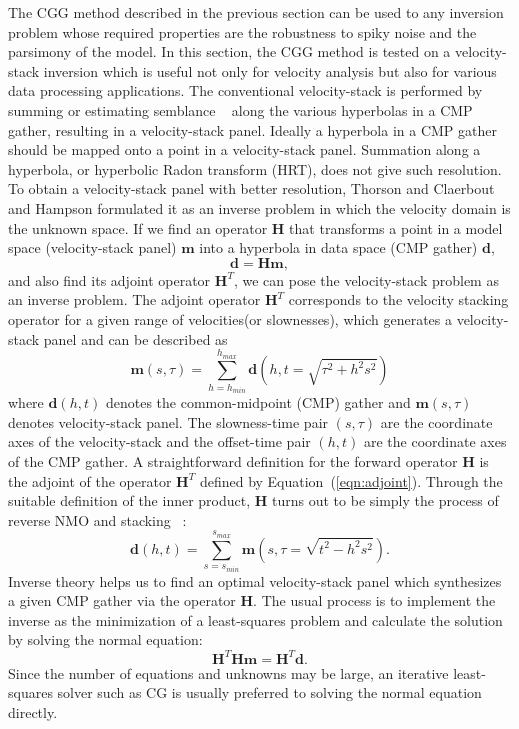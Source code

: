 The CGG method described in the previous section can be used to any inversion problem 
whose required properties are the robustness to spiky noise and the parsimony of the model.
In this section, the CGG method is tested on a velocity-stack inversion
which is useful not only for velocity analysis 
but also for various data processing applications.
The conventional velocity-stack
is performed by summing or estimating semblance ~\cite{GEO34-06-08590881}
along the various hyperbolas in a CMP gather, 
resulting in a velocity-stack panel.
Ideally a hyperbola in a CMP gather should be mapped 
onto a point in a velocity-stack panel. 
Summation along a hyperbola, or hyperbolic Radon transform (HRT), 
does not give such resolution.
To obtain a velocity-stack panel with better resolution,
Thorson and Claerbout  and Hampson 
formulated it as an inverse problem in which the velocity
domain is the unknown space.  
If we find an operator $\mathbf H$ that transforms 
a point in a model space (velocity-stack panel) $\mathbf m$ 
into a hyperbola in data space (CMP gather) $\mathbf d$, 
\begin{equation}
\mathbf d = \mathbf H \mathbf m ,
\end{equation}
and also find its adjoint operator $\mathbf H^T$,
we can pose the velocity-stack problem as an inverse problem.
The adjoint operator $\mathbf H^T$ corresponds to the velocity stacking operator 
for a given range of velocities(or slownesses), which generates a velocity-stack panel 
and can be described as
\begin{equation}
{\mathbf m}(s,\tau) = \sum_{h=h_{min}}^{h_{max}} {\mathbf d}(h,t=\sqrt{\tau^2+h^2 s^2})
\label{eqn:adjoint}
\end{equation}
where ${\mathbf d(h,t)}$ denotes the common-midpoint (CMP) gather and 
${\mathbf m}(s,\tau)$ denotes velocity-stack panel. 
The slowness-time pair $(s,\tau)$ are the coordinate axes of the velocity-stack 
and the offset-time pair $(h,t)$ are the coordinate axes of the CMP gather.
A straightforward definition for the forward operator $\mathbf H$ is the adjoint 
of the operator $\mathbf H^T$ defined by Equation~(\ref{eqn:adjoint}). 
Through the suitable definition of the inner product, 
$\mathbf H$ turns out to be simply the process of reverse NMO and stacking ~\cite{GEO50.12.27272741}:
\begin{equation}
{\mathbf d}(h,t) = \sum_{s=s_{min}}^{s_{max}} {\mathbf m}(s,\tau = \sqrt{t^2-h^2 s^2}).
\end{equation}
Inverse theory helps us to find an optimal velocity-stack panel which synthesizes
a given CMP gather via the operator $\mathbf H$.
The usual process is to implement the inverse as the minimization 
of a least-squares problem and calculate the solution by solving
the normal equation:
\begin{equation}
\mathbf H^T \mathbf H \mathbf m = \mathbf H^T \mathbf d.
\end{equation}
Since the number of equations and unknowns may be large, 
an iterative least-squares solver such as CG is 
usually preferred to solving the normal equation directly.

